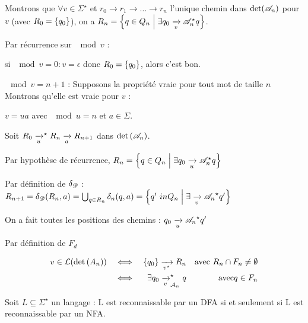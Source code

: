 \documentclass[a4paper,french,bookmarks]{book}
\begin{document}
    \begin{nproof}
        Montrons que $\forall v \in \Sigma^\star$ et $r_0 \to r_1 \to \dots \to r_n$ l'unique chemin dans $\det \p{\bsA_n}$ pour $v$ (avec $R_0 = \left\{q_0\right\}$), on a $R_n = \ens{q \in Q_n \enstq \exists q_0 \lima{v}{\bsA_n^\star} q}$.
        
        Par récurrence sur $\mod{v}$ :
        \begin{enumerate}
            \itt si $\mod{v} = 0 : v = \epsilon$ donc $R_0 = \left\{q_0\right\}$, alors c'est bon.
            
            \itt $\mod{v} = n + 1$ : Supposons la propriété vraie pour tout mot de taille $n$ Montrons qu'elle est vraie pour $v$ :
            
            $v = ua$ avec $\mod{u} = n$ et $a \in \Sigma$.
            
            Soit $R_0 \lima{u}^\star R_n \lima{a} R_{n+1}$ dans $ \det{\bsA_n}$.
            
            Par hypothèse de récurrence, $R_n = \ens{q \in Q_n \enstq \exists q_0 \lima{u}{\bsA_n^\star} q}$
            
            Par définition de $\delta_{\mathscr{D}}$ :
            $R_{n+1} = \delta_\bsD \p{R_n, a} = \bigcup_{q \in R_n} \delta_n \p{q, a} = \ens{q' \ in Q_n \enstq \exists \lima{v}{\bsA_n}^\star q'}$
            
            \itt On a fait toutes les positions des chemins : $q_0 \lima{u}{\bsA_n}^\star q'$
        
        
        
            Par définition de $F_d$
            
            \begin{align*}
                v \in \bcL\p{\det{A_n}} &&\iff&& \ens{q_0} \lima{v^\star} R_n &&\text{avec} \ R_n \cap F_n \neq \emptyset\\
                &&\iff&& \exists q_0 \lima{v}^\star_{\bcA_n} q &&\text{avec} q \in F_n
            \end{align*}
            
        \end{enumerate}
    \end{nproof}
    
    \begin{corollary}{}{}
        Soit $L \subseteq \Sigma^\star$ un langage : L est reconnaissable par un DFA si et seulement si L est reconnaissable par un NFA.
    \end{corollary}
    
\end{document}
